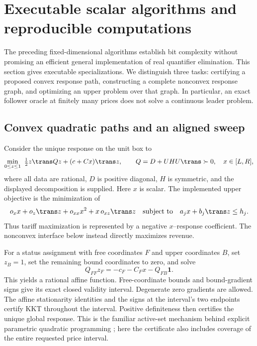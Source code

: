 \section{Executable scalar algorithms and reproducible computations}
\label{sec:computation}

The preceding fixed-dimensional algorithms establish bit complexity without
promising an efficient general implementation of real quantifier elimination.
This section gives executable specializations. We distinguish three tasks:
certifying a proposed convex response path, constructing a complete nonconvex
response graph, and optimizing an upper problem over that graph. In particular,
an exact follower oracle at finitely many prices does not solve a continuous
leader problem.

\subsection{Convex quadratic paths and an aligned sweep}
\label{subsec:convex-implementation}
Consider the unique response on the unit box to
\begin{equation}\label{eq:implemented-convex}
 \min_{0\le z\le1}\ \tfrac12z\trans Qz+(c+Cx)\trans z,
 \qquad Q=D+UHU\trans\succ0,\quad x\in[L,R],
\end{equation}
where all data are rational, $D$ is positive diagonal, $H$ is symmetric,
and the displayed decomposition is supplied. Here $x$ is scalar. The
implemented upper objective is the minimization of
\begin{equation}\label{eq:implemented-upper}
 o_xx+o_z\trans z+o_{xx}x^2+x\,o_{xz}\trans z
 \quad\text{subject to}\quad a_jx+b_j\trans z\le h_j.
\end{equation}
Thus tariff maximization is represented by a negative $x$--response coefficient.
The nonconvex interface below instead directly maximizes revenue.

For a status assignment with free coordinates $F$ and upper coordinates $B$,
set $z_B=1$, set the remaining bound coordinates to zero, and solve
\[
 Q_{FF}z_F=-c_F-C_Fx-Q_{FB}\mathbf1.
\]
This yields a rational affine function. Free-coordinate bounds and bound-gradient
signs give its exact closed validity interval. Degenerate zero gradients are
allowed. The affine stationarity identities and the signs at the interval's
two endpoints certify KKT throughout the interval. Positive definiteness then
certifies the unique global response. This is the familiar active-set mechanism
behind explicit parametric quadratic programming
\citep[Theorems 2 and 4]{BemporadEtAl2002}; here the certificate also includes
coverage of the entire requested price interval.

